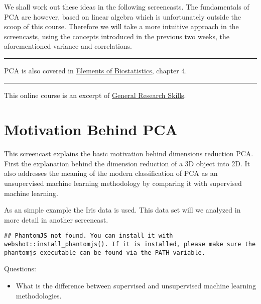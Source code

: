 \documentclass[
]{book}
\providecommand{\tightlist}{%
  \setlength{\itemsep}{0pt}\setlength{\parskip}{0pt}}
\begin{document}
We shall work out these ideas in the following screencasts. The fundamentals of PCA are however, based on linear algebra which is unfortunately outside the scoop of this course. Therefore we will take a more intuitive approach in the screencasts, using the concepts introduced in the previous two weeks, the aforementioned variance and correlations.

\begin{center}\rule{0.5\linewidth}{0.5pt}\end{center}

PCA is also covered in \href{https://github.com/FransRodenburg/Biostatistics-Book-Series/blob/main/Elements_of_Biostatistics_Sep2020.pdf}{Elements of Biostatistics}, chapter 4.

\begin{center}\rule{0.5\linewidth}{0.5pt}\end{center}

This online course is an excerpt of \href{https://fransrodenburg.github.io/General-Research-Skills/}{General Research Skills}.

\hypertarget{motivation-behind-pca}{%
\chapter{Motivation Behind PCA}\label{motivation-behind-pca}}

This screencast explains the basic motivation behind dimensions reduction PCA. First the explanation behind the dimension reduction of a 3D object into 2D. It also addresses the meaning of the modern classification of PCA as an unsupervised machine learning methodology by comparing it with supervised machine learning.

As an simple example the Iris data is used. This data set will we analyzed in more detail in another screencast.

\begin{verbatim}
## PhantomJS not found. You can install it with webshot::install_phantomjs(). If it is installed, please make sure the phantomjs executable can be found via the PATH variable.
\end{verbatim}

Questions:

\begin{itemize}
\tightlist
\item
  What is the difference between supervised and unsupervised machine learning methodologies.
\end{itemize}
\end{document}
